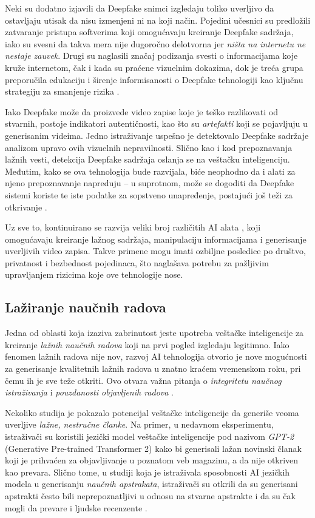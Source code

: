 \documentclass[a4paper,12pt]{article}
\begin{document}
Neki su dodatno izjavili da Deepfake snimci izgledaju toliko uverljivo da ostavljaju utisak da nisu izmenjeni ni na koji način. Pojedini učesnici su predložili zatvaranje pristupa softverima koji omogućavaju kreiranje Deepfake sadržaja, iako su svesni da takva mera nije dugoročno delotvorna jer \textit{ništa na internetu ne nestaje zauvek}. Drugi su naglasili značaj podizanja svesti o informacijama koje kruže internetom, čak i kada su praćene vizuelnim dokazima, dok je treća grupa preporučila edukaciju i širenje informisanosti o Deepfake tehnologiji kao ključnu strategiju za smanjenje rizika \cite{Nazar_2020}.

Iako Deepfake može da proizvede video zapise koje je teško razlikovati od stvarnih, postoje indikatori autentičnosti, kao što su \textit{artefakti} koji se pojavljuju u generisanim videima. Jedno istraživanje uspešno je detektovalo Deepfake sadržaje analizom upravo ovih vizuelnih nepravilnosti. Slično kao i kod prepoznavanja lažnih vesti, detekcija Deepfake sadržaja oslanja se na veštačku inteligenciju. Međutim, kako se ova tehnologija bude razvijala, biće neophodno da i alati za njeno prepoznavanje napreduju – u suprotnom, može se dogoditi da Deepfake sistemi koriste te iste podatke za sopstveno unapređenje, postajući još teži za otkrivanje \cite{Nazar_2020}.

Uz sve to, kontinuirano se razvija veliki broj različitih AI alata \cite{Nazar_2020}, koji omogućavaju kreiranje lažnog sadržaja, manipulaciju informacijama i generisanje uverljivih video zapisa. Takve primene mogu imati ozbiljne posledice po društvo, privatnost i bezbednost pojedinaca, što naglašava potrebu za pažljivim upravljanjem rizicima koje ove tehnologije nose.

\subsection{Lažiranje naučnih radova}

Jedna od oblasti koja izaziva zabrinutost jeste upotreba veštačke inteligencije za kreiranje \textit{lažnih naučnih radova} koji na prvi pogled izgledaju legitimno. Iako fenomen lažnih radova nije nov, razvoj AI tehnologija otvorio je nove mogućnosti za generisanje kvalitetnih lažnih radova u znatno kraćem vremenskom roku, pri čemu ih je sve teže otkriti. Ovo otvara važna pitanja o \textit{integritetu naučnog istraživanja} i \textit{pouzdanosti objavljenih radova} \cite{doi/10.2196/46924}.

Nekoliko studija je pokazalo potencijal veštačke inteligencije da generiše veoma uverljive \textit{lažne, nestručne članke}. Na primer, u nedavnom eksperimentu, istraživači su koristili jezički model veštačke inteligencije pod nazivom \textit{GPT-2} (Generative Pre-trained Transformer 2) kako bi generisali lažan novinski članak koji je prihvaćen za objavljivanje u poznatom veb magazinu, a da nije otkriven kao prevara. Slično tome, u studiji koja je istraživala sposobnosti AI jezičkih modela u generisanju \textit{naučnih apstrakata}, istraživači su otkrili da su generisani apstrakti često bili neprepoznatljivi u odnosu na stvarne apstrakte i da su čak mogli da prevare i ljudske recenzente \cite{doi/10.2196/46924}.
\end{document}
